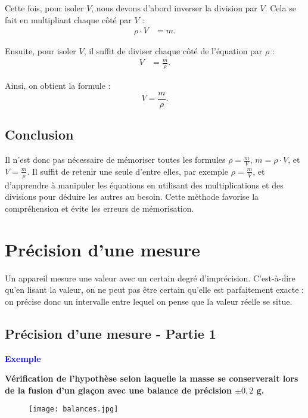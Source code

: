 \documentclass[a4paper,12pt]{article}
\begin{document}
Cette fois, pour isoler $V$, nous devons d'abord inverser la division par $V$. Cela se fait en multipliant chaque côté par $V$ :
\begin{align}
\rho \cdot V &= m.
\end{align}

Ensuite, pour isoler $V$, il suffit de diviser chaque côté de l'équation par $\rho$ :
\begin{align}
V &= \frac{m}{\rho}.
\end{align}

Ainsi, on obtient la formule :
\begin{equation}
V = \frac{m}{\rho}.
\end{equation}

\subsection*{Conclusion}

Il n'est donc pas nécessaire de mémoriser toutes les formules $\rho = \frac{m}{V}$, $m = \rho \cdot V$, et $V = \frac{m}{\rho}$. Il suffit de retenir une seule d'entre elles, par exemple $\rho = \frac{m}{V}$, et d'apprendre à manipuler les équations en utilisant des multiplications et des divisions pour déduire les autres au besoin. Cette méthode favorise la compréhension et évite les erreurs de mémorisation.


\section{Précision d'une mesure}

Un appareil mesure une valeur avec un certain degré d'imprécision. C'est-à-dire qu'en lisant la valeur, on ne peut pas être certain qu'elle est parfaitement exacte : on précise donc un intervalle entre lequel on pense que la valeur réelle se situe. 

\subsection{Précision d'une mesure - Partie 1}

\textcolor{blue}{\textbf{Exemple}} 
\vspace{1em}

\textbf{Vérification de l’hypothèse selon laquelle la masse se conserverait lors de la fusion d’un glaçon avec une balance de précision $\pm 0,2$ g.}

\begin{figure}[H]
  \centering
  \texttt{[image: balances.jpg]}
\end{figure}
\end{document}
